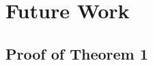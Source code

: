 \documentclass[conference]{IEEEtran}
\begin{document}
\section{Future Work}





\onecolumn
\appendix

\subsection{Proof of Theorem 1} \label{thm:1}
\end{document}
